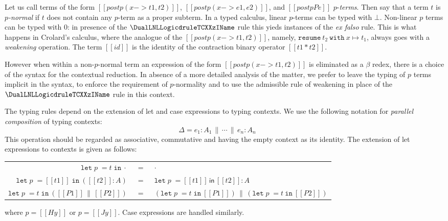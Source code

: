 \begin{remark}
  Let us call terms of the form $[[postp(x -> t1,t2)]]$, $[[postp (x
      -> e1,e2)]]$, and $[[postpP e]]$ $p$-\emph{terms}. Then say that
  a term $t$ is \emph{$p$-normal} if $t$ does not contain any $p$-term
  as a proper subterm.  In a typed calculus, linear $p$-terms can be typed
  with $\bot$.  Non-linear $p$ terms can be typed with $0$:  in
  presence of the $\DualLNLLogicdruleTCXXzIName$ rule this yieds
instances of the \emph{ex falso} rule. This is what happens in Crolard's 
calculus, where the analogue of the $[[postp(x -> t1,t2)]]$, namely, 
$\mathtt{resume}\ t_2\ \mathtt{with}\ x\mapsto t_1$, always goes with a 
\emph{weakening} operation. The term $[[id]]$ is the identity of the
contraction binary operator $[[t1 * t2]]$.

However when within a non-$p$-normal term an expression of the form 
$[[postp(x -> t1,t2)]]$ is eliminated as a $\beta$ redex, there is a choice
of the syntax for the contextual reduction. In absence of a more detailed 
analysis of the matter, we prefer to leave the typing of $p$ terms implicit 
in the syntax, to enforce the requirement of $p$-normality and to use the 
admissible rule of weakening in place of the  $\DualLNLLogicdruleTCXXzIName$ 
rule in this context. 
\end{remark}

The typing rules depend on the extension of let and case expressions
to typing contexts.  We use the following notation for \emph{parallel
  composition} of typing contexts:
\[
\Delta = e_1: A_1\,\|\, \cdots \,\|\, e_n: A_n\qquad 
\]
This operation should be regarded as associative, commutative and
having the empty context as its identity. 
The extension of let expressions to contexts is given as follows:
\begin{center}
  \begin{tabular}{rcl}
    $\mathtt{let}\; p\; = t\; \mathtt{in}\ \cdot$ &\ =\ & $\cdot$\\
    $\mathtt{let}\; p\; = [[t1]]\; \mathtt{in}\ ([[t2]]: A)$ &\ =\ & $\mathtt{let}\; p\; = [[t1]]\,\mathsf{in}\,[[t2]] : A$\\
    $\mathtt{let}\; p\; = t\; \mathtt{in}\ ([[P1]]\,\|\,[[P2]])$ &\ =\ & 
    $(\mathtt{let}\; p\; = t\; \mathtt{in}\ [[P1]])\,\|\, (\mathtt{let}\; p\; = t\ \mathtt{in}\ [[P2]])$
  \end{tabular}
\end{center}
where $p = [[H y]]$ or $p = [[J y]]$.
Case expressions are handled similarly.

